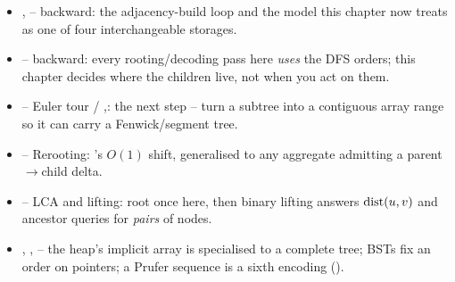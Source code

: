 
\begin{itemize}[nosep, leftmargin=1.4em]
  \item {},  -- backward: the adjacency-build loop 
        and the  model this chapter now treats as one of four interchangeable
        storages.
  \item {} -- backward: every rooting/decoding pass here \emph{uses} the DFS orders;
        this chapter decides where the children live, not when you act on them.
  \item {} -- Euler tour / ,: the next step -- turn a subtree
        into a contiguous array range so it can carry a Fenwick/segment tree.
  \item {} -- Rerooting: 's $O(1)$ shift, generalised to any
        aggregate admitting a parent$\to$child delta.
  \item {} -- LCA and lifting: root once here, then binary lifting answers
        $\operatorname{dist}(u,v)$ and ancestor queries for \emph{pairs} of nodes.
  \item {}, ,  -- the heap's implicit array is
         specialised to a complete tree; BSTs fix an order on pointers;
        a Prufer sequence is a sixth encoding ().
\end{itemize}

